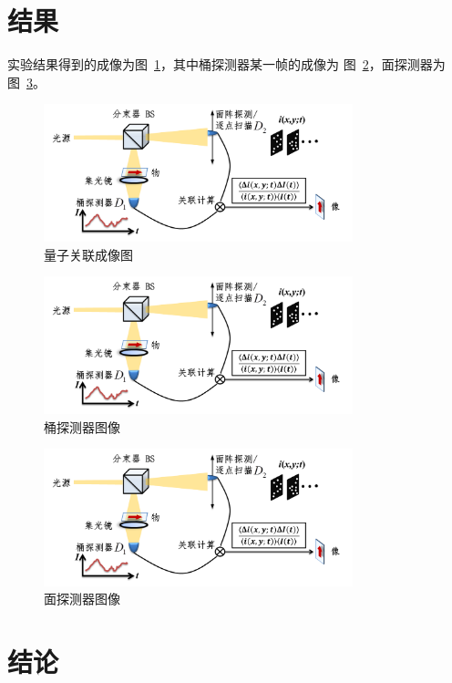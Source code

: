\documentclass[10pt]{ctexart}
\begin{document}
\section{结果}
实验结果得到的成像为图~\ref{fig:picture}，其中桶探测器某一帧的成像为
图~\ref{fig:pic1}，面探测器为图~\ref{fig:pic2}。
\begin{figure}
    \centering
    \includegraphics[width=0.8\textwidth]{data/instrument.png}
    \caption{量子关联成像图}
    \label{fig:picture}
\end{figure}
\begin{figure}
    \centering
    \includegraphics[width=0.8\textwidth]{data/instrument.png}
    \caption{桶探测器图像}
    \label{fig:pic1}
\end{figure}
\begin{figure}
    \centering
    \includegraphics[width=0.8\textwidth]{data/instrument.png}
    \caption{面探测器图像}
    \label{fig:pic2}
\end{figure}
\section{结论}

\end{document}
